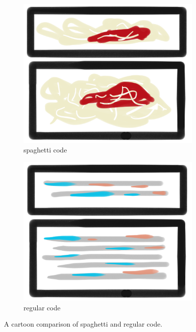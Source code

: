 \begin{figure}
  \centering
  \begin{subfigure}[b]{0.5\textwidth}
    \centering
    \includegraphics[width=\textwidth]{img/spaghetticode}
    \caption{spaghetti code}
    \label{subfig:spaghetti_code}
  \end{subfigure}%
  \hfill
  \begin{subfigure}[b]{0.5\textwidth}
    \centering
    \includegraphics[width=\textwidth]{img/regularcode}
    \caption{regular code}
     \label{subfig:regular_code}
  \end{subfigure}
  \captionsetup{singlelinecheck=off,justification=raggedright}
  \caption{A cartoon comparison of spaghetti and regular code.}
  \label{fig:direct_irregular_vs_indirect_regular}
\end{figure}